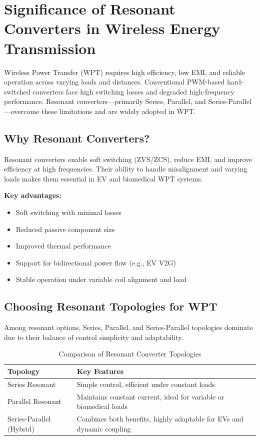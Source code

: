 \documentclass[12pt,a4paper]{report}
\begin{document}
\chapter{Significance of Resonant Converters in Wireless Energy Transmission}
\vspace{1cm}

\quad Wireless Power Transfer (WPT) requires high efficiency, low EMI, and reliable operation across varying loads and distances. Conventional PWM-based hard-switched converters face high switching losses and degraded high-frequency performance. Resonant converters—primarily Series, Parallel, and Series-Parallel—overcome these limitations and are widely adopted in WPT.

\section{Why Resonant Converters?}

\quad Resonant converters enable soft switching (ZVS/ZCS), reduce EMI, and improve efficiency at high frequencies. Their ability to handle misalignment and varying loads makes them essential in EV and biomedical WPT systems.\cite{irivennela2020wireless}\cite{erickson2020resonant}

\textbf{Key advantages:}
\begin{itemize}
  \item Soft switching with minimal losses
  \item Reduced passive component size
  \item Improved thermal performance
  \item Support for bidirectional power flow (e.g., EV V2G)
  \item Stable operation under variable coil alignment and load
\end{itemize}

\section{Choosing Resonant Topologies for WPT}

\quad Among resonant options, Series, Parallel, and Series-Parallel topologies dominate due to their balance of control simplicity and adaptability.

\begin{table}[H]
\centering
\renewcommand{\arraystretch}{1.2}
\begin{tabular}{|p{4cm}|p{11cm}|}
\hline
\textbf{Topology} & \textbf{Key Features} \\
\hline
Series Resonant & Simple control, efficient under constant loads \\
\hline
Parallel Resonant & Maintains constant current, ideal for variable or biomedical loads \\
\hline
Series-Parallel (Hybrid) & Combines both benefits, highly adaptable for EVs and dynamic coupling \\
\hline
\end{tabular}
\caption{Comparison of Resonant Converter Topologies\cite{lin2021analysis}}
\label{tab:resonant_topologies}
\end{table}
\end{document}
